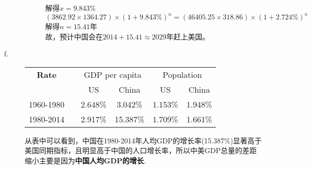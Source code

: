\documentclass[UTF8, onecolumn, a4paper]{article}
\begin{document}
\begin{description}
\begin{description}
解得$x = 9.843\%$\\
$(3862.92\times1364.27)\times(1+9.843\%)^n = (46405.25\times318.86)\times(1+2.724\%)^n$\\解得$n = 15.41$年\\
故，预计中国会在$2014+15.41\approx 2029$年赶上美国。
\end{description}
\item[f.]\quad
\begin{center}
\begin{tabular}{cccccc}
	\hline
	\textbf{Rate} && \multicolumn{2}{c}{GDP per capita} & \multicolumn{2}{c}{Population}  \\
	\cline{2-6}
	&& US & China & US & China \\
	\hline
	1960-1980&& 2.648\% & 3.042\% &  1.153\% & 1.948\% \\
	1980-2014&& 2.917\%& 15.387\% & 1.709\% & 1.661\%  \\
	\hline
\end{tabular}
\end{center}
从表中可以看到，中国在1980-2014年人均GDP的增长率(15.387\%)显著高于美国同期指标，且明显高于中国的人口增长率，所以中美GDP总量的差距缩小主要是因为{\bfseries 中国人均GDP的增长}.
\end{description}
\end{document}
